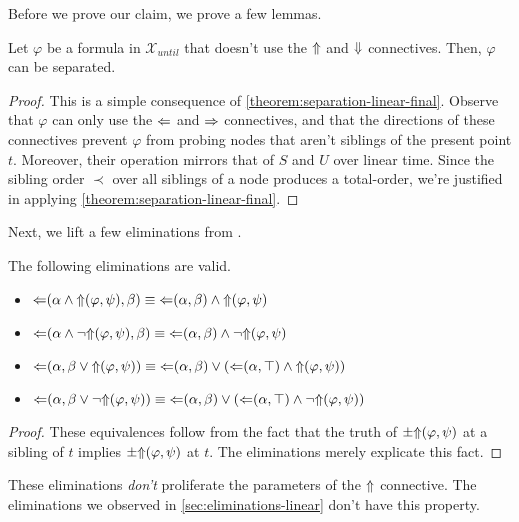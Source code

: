 \documentclass[a4paper,UKenglish,cleveref, autoref, thm-restate, numberwithinsect]{lipics-v2021}
\def\Larrow{\ensuremath\mathord{\Leftarrow}}
\def\Rarrow{\ensuremath\mathord{\Rightarrow}}
\def\Uarrow{\ensuremath\mathord{\Uparrow}}
\def\Darrow{\ensuremath\mathord{\Downarrow}}
\begin{document}
Before we prove our claim, we prove a few lemmas.
\begin{lemma}
    \label{lemma:partial-separation-trees-step1}
    Let $\varphi$ be a formula in $\mathcal{X}_{until}$ that doesn't use the $\Uarrow$ and $\Darrow$ connectives. Then, $\varphi$ can be separated.
\end{lemma}
\begin{proof}
    This is a simple consequence of \cref{theorem:separation-linear-final}. Observe that $\varphi$ can only use the $\Larrow$ and $\Rarrow$ connectives, and that the directions of these connectives prevent $\varphi$ from probing nodes that aren't siblings of the present point $t$. Moreover, their operation mirrors that of $S$ and $U$ over linear time. Since the sibling order $\prec$ over all siblings of a node produces a total-order, we're justified in applying \cref{theorem:separation-linear-final}.
\end{proof}
Next, we lift a few eliminations from \cite{xpathComplete}.
\begin{lemma}
    \label{lemma:partial-separation-trees-step2}
    The following eliminations are valid.
    \begin{itemize}
        \item $\Larrow(\alpha \land \mathord{\Uarrow}(\varphi, \psi), \beta) \equiv \Larrow(\alpha, \beta) \land \Uarrow(\varphi, \psi)$
        \item $\Larrow(\alpha \land \lnot \Uarrow (\varphi, \psi), \beta) \equiv \Larrow(\alpha, \beta) \land \lnot \Uarrow(\varphi, \psi)$
        \item $\Larrow(\alpha, \beta \lor \Uarrow(\varphi, \psi)) \equiv \Larrow(\alpha, \beta) \lor \left( \Larrow(\alpha, \top) \land \Uarrow(\varphi, \psi) \right)$
        \item $\Larrow(\alpha, \beta \lor \lnot \Uarrow(\varphi, \psi)) \equiv \Larrow(\alpha, \beta) \lor \left( \Larrow(\alpha, \top) \land \lnot \Uarrow(\varphi, \psi) \right)$
    \end{itemize}
\end{lemma}
\begin{proof}
    These equivalences follow from the fact that the truth of $\pm \Uarrow(\varphi, \psi)$ at a sibling of $t$ implies $\pm \Uarrow(\varphi,\psi)$ at $t$. The eliminations merely explicate this fact.
\end{proof}
\begin{note*}
    These eliminations \textit{don't} proliferate the parameters of the $\Uarrow$ connective. The eliminations we observed in \cref{sec:eliminations-linear} don't have this property.
\end{note*}
\end{document}
